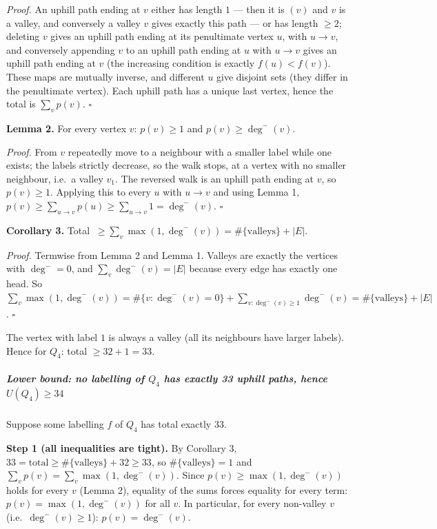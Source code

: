 \emph{Proof.} An uphill path ending at \(v\) either has length \(1\) ---
then it is \((v)\) and \(v\) is a valley, and conversely a valley \(v\)
gives exactly this path --- or has length \(\ge2\); deleting \(v\) gives
an uphill path ending at its penultimate vertex \(u\), with \(u\to v\),
and conversely appending \(v\) to an uphill path ending at \(u\) with
\(u\to v\) gives an uphill path ending at \(v\) (the increasing
condition is exactly \(f(u)<f(v)\)). These maps are mutually inverse,
and different \(u\) give disjoint sets (they differ in the penultimate
vertex). Each uphill path has a unique last vertex, hence the total is
\(\sum_v p(v)\). \(\square\)

\textbf{Lemma 2.} For every vertex \(v\): \(p(v)\ge1\) and
\(p(v)\ge\deg^-(v)\).

\emph{Proof.} From \(v\) repeatedly move to a neighbour with a smaller
label while one exists; the labels strictly decrease, so the walk stops,
at a vertex with no smaller neighbour, i.e.~a valley \(v_1\). The
reversed walk is an uphill path ending at \(v\), so \(p(v)\ge1\).
Applying this to every \(u\) with \(u\to v\) and using Lemma 1,
\(p(v)\ge\sum_{u\to v}p(u)\ge\sum_{u\to v}1=\deg^-(v)\). \(\square\)

\textbf{Corollary 3.} Total
\(\ \ge\sum_v\max(1,\deg^-(v))=\#\{\text{valleys}\}+|E|\).

\emph{Proof.} Termwise from Lemma 2 and Lemma 1. Valleys are exactly the
vertices with \(\deg^-=0\), and \(\sum_v\deg^-(v)=|E|\) because every
edge has exactly one head. So
\(\sum_v\max(1,\deg^-(v))=\#\{v:\deg^-(v)=0\}+\sum_{v:\deg^-(v)\ge1}\deg^-(v)=\#\{\text{valleys}\}+|E|\).
\(\square\)

The vertex with label \(1\) is always a valley (all its neighbours have
larger labels). Hence for \(Q_4\): total \(\ge 32+1=33\).

\subparagraph{\texorpdfstring{Lower bound: no labelling of \(Q_4\) has
exactly 33 uphill paths, hence
\(U(Q_4)\ge34\)}{Lower bound: no labelling of Q\_4 has exactly 33 uphill paths, hence U(Q\_4)\textbackslash ge34}}\label{lower-bound-no-labelling-of-q_4-has-exactly-33-uphill-paths-hence-uq_4ge34}

Suppose some labelling \(f\) of \(Q_4\) has total exactly \(33\).

\textbf{Step 1 (all inequalities are tight).} By Corollary 3,
\(33=\text{total}\ge\#\{\text{valleys}\}+32\ge 33\), so
\(\#\{\text{valleys}\}=1\) and \(\sum_v p(v)=\sum_v\max(1,\deg^-(v))\).
Since \(p(v)\ge\max(1,\deg^-(v))\) holds for every \(v\) (Lemma 2),
equality of the sums forces equality for every term:
\(p(v)=\max(1,\deg^-(v))\) for all \(v\). In particular, for every
non-valley \(v\) (i.e.~\(\deg^-(v)\ge1\)): \(p(v)=\deg^-(v)\).

